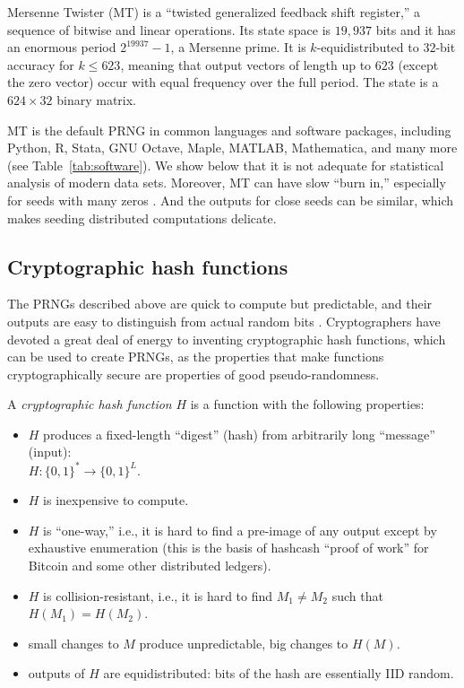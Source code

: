 \documentclass[graybox]{svmult}
\begin{document}
Mersenne Twister (MT) \cite{matsumoto_mersenne_1998} is a ``twisted generalized feedback shift register,'' a sequence of bitwise and linear operations.
Its state space is $19,937$ bits and it has an enormous period $2^{19937}-1$, a Mersenne prime.
It is $k$-equidistributed to $32$-bit accuracy for $k \leq 623$, 
meaning that output vectors of length up to $623$ (except the zero vector) occur with equal frequency over the full period.
The state is a $624 \times 32$ binary matrix.

MT is the default PRNG in common languages and software packages, including Python, R, Stata, 
GNU Octave, Maple, MATLAB, Mathematica, and many more (see Table~\ref{tab:software}).
We show below that it is not adequate for statistical analysis of modern data sets.
Moreover, MT can have slow ``burn in,'' especially for seeds with many zeros \cite{saito_simd-oriented_2008}.
And the outputs for close seeds can be similar, which makes seeding distributed computations
delicate.

\subsection{Cryptographic hash functions}
The PRNGs described above are quick to compute but predictable,
and their outputs are easy to distinguish from actual random bits \cite{lecuyer_testu01_2007}.
Cryptographers have devoted a great deal of energy to inventing cryptographic hash functions,
which can be used to create PRNGs, as the properties that make functions cryptographically secure
are properties of good pseudo-randomness.

A \emph{cryptographic hash function} $H$ is a function with the following properties:

\begin{itemize}
\item $H$ produces a fixed-length ``digest'' (hash) from arbitrarily long ``message'' (input):\\ $H:\{0, 1\}^* \rightarrow \{0, 1\}^L$.
\item $H$ is inexpensive to compute.
\item $H$ is ``one-way,'' i.e., it is hard to find a pre-image of any output except by exhaustive enumeration (this is the basis of  hashcash ``proof of work'' for Bitcoin and some other distributed ledgers).
\item $H$ is collision-resistant, i.e., it is hard to find $M_1 \ne M_2$ such that $H(M_1) = H(M_2)$.
\item small changes to $M$ produce unpredictable, big changes to $H(M)$.
\item outputs of $H$ are equidistributed: bits of the hash are essentially IID random.
\end{itemize}
\end{document}
